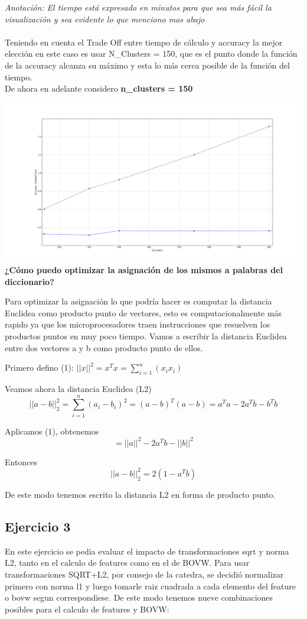 \documentclass[11pt, spanish, a4paper]{article}
\begin{document}
\textit{Anotación: El tiempo está expresado en minutos para que sea más fácil la visualización y sea evidente lo que menciono mas abajo} \\
\\
Teniendo en cuenta el Trade Off entre tiempo de cálculo y accuracy la mejor elección en este caso es usar N\_Clusters = 150, que es el punto donde la función de la accuracy alcanza su máximo y esta lo más cerca posible de la función del tiempo.\\
De ahora en adelante considero \textbf{n\_clusters = 150}

\includegraphics[scale=0.5, width=\textwidth]{figure_6.png}\\

\textbf{¿Cómo puedo optimizar la asignación de los mismos a palabras del diccionario?}


Para optimizar la asignación lo que podría hacer es computar la distancia Euclidea como producto punto de vectores, esto es computacionalmente más rapido ya que los microprocesadores traen instrucciones que resuelven los productos puntos en muy poco tiempo.
Vamos a escribir la distancia Euclidea entre dos vectores a y b como producto punto de ellos.

Primero defino (1): $||x||^2 = x^Tx = \displaystyle\sum_{i=1}^{n} (x_i x_i)$

Veamos ahora la distancia Euclidea (L2)
$$||a - b||_2^2 = \displaystyle\sum_{i=1}^{n} (a_i - b_i)^2 = (a-b)^T(a-b) = a^Ta-2a^Tb-b^Tb $$

Aplicamos (1), obtenemos
$$ = ||a||^2 -2a^Tb - ||b||^2 $$

Entonces
$$ ||a - b||_2^2 = 2(1-a^Tb) $$

De este modo tenemos escrito la distancia L2 en forma de producto punto.

\subsection{Ejercicio 3}
\label{ejercicio3}
En este ejercicio se pedia evaluar el impacto de transformaciones sqrt y norma L2, tanto en el calculo de features como en el de BOVW. Para usar transformaciones SQRT+L2, por consejo de la catedra, se decidió normalizar primero con norma l1 y luego tomarle raiz cuadrada a cada elemento del feature o bovw segun correspondiese.
De este modo tenemos nueve combinaciones posibles para el calculo de features y BOVW:
 
\end{document}
